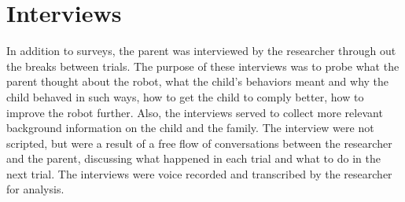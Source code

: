 \section{Interviews}
In addition to surveys, the parent was interviewed by the researcher through out the breaks between trials.  The purpose of these interviews was to probe what the parent thought about the robot, what the child's behaviors meant and why the child behaved in such ways, how to get the child to comply better, how to improve the robot further.  Also, the interviews served to collect more relevant background information on the child and the family.  The interview were not scripted, but were a result of a free flow of conversations between the researcher and the parent, discussing what happened in each trial and what to do in the next trial.  The interviews were voice recorded and transcribed by the researcher for analysis.

